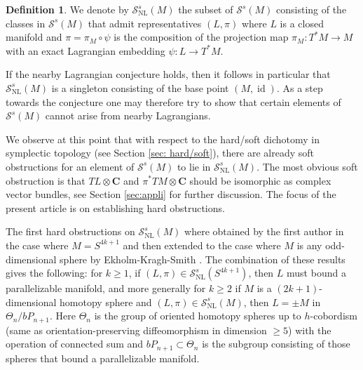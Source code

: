 \documentclass[reqno]{amsart}
\theoremstyle{theorem}
\theoremstyle{remark}
\theoremstyle{definition}
\newtheorem{definition}[corollary]{Definition}
\newcommand{\bC}{\mathbf{C}}
\newcommand{\NL}{\mathrm{NL}}
\renewcommand{\SS}{\mathcal{S}}
\DeclareMathOperator{\id}{id}
\begin{document}
\begin{definition}
We denote by $\SS^s_\NL(M)$ the subset of $\SS^s(M)$ consisting of the classes in $\SS^s(M)$ that admit representatives $(L,\pi)$
where $L$ is a closed manifold and $\pi=\pi_M\circ \psi$ is the composition of the projection map $\pi_M\colon T^*M \to M$ with an exact Lagrangian embedding $\psi\colon L \to T^*M$.
\end{definition}


If the nearby Lagrangian conjecture holds, then it follows in particular that $\SS^s_\NL(M)$ is a singleton consisting of the base point $(M,\id)$. As a step towards the conjecture one may therefore try to show that certain elements of $\SS^s(M)$ cannot arise from nearby Lagrangians.


We observe at this point that with respect to the hard/soft dichotomy in symplectic topology (see Section \ref{sec: hard/soft}), there are already soft obstructions for an element of $\SS^s(M)$ to lie in $\SS^s_\NL(M)$. The most obvious soft obstruction is that $TL \otimes \bC$ and $\pi^* TM \otimes \bC$ should be isomorphic as complex vector bundles, see Section \ref{sec:appli} for further discussion. The focus of the present article is on establishing hard obstructions. 


The first hard obstructions on $\SS^s_\NL(M)$ where obtained by the first author \cite{A08} in the case where $M=S^{4k+1}$
and then extended to the case where $M$ is any odd-dimensional sphere by Ekholm-Kragh-Smith \cite{ES16, EKS16}. The combination of these results gives the following: for $k \geq 1$, if $(L,\pi) \in \SS^s_\NL(S^{4k+1})$, then $L$ must bound a parallelizable manifold, and more generally for $k\geq 2$ if $M$ is a $(2k+1)$-dimensional homotopy sphere and $(L,\pi) \in \SS^s_\NL(M)$, then $L = \pm M$ in $\Theta_n/bP_{n+1}$. Here $\Theta_n$ is the group of oriented homotopy spheres up to $h$-cobordism (same as orientation-preserving diffeomorphism in dimension $\geq 5$) with the operation of connected sum and $bP_{n+1} \subset \Theta_n$ is the subgroup consisting of those spheres that bound a parallelizable manifold. 


\end{document}
